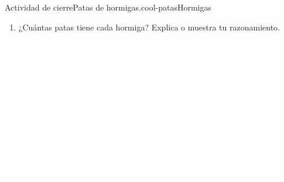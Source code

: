 \documentclass[14pt]{extarticle}
\begin{document}
\begin{project}{Actividad de cierre}{Patas de hormigas.}{cool-patasHormigas}
\begin{enumerate}[label={(\alph*)}]
\begin{image}{0}{1}{0}{}
\end{image}%
\item{}¿Cuántas patas tiene cada hormiga? Explica o muestra tu razonamiento.%
\begin{image}{0}{1}{0}{}%
\includegraphics[max width=\linewidth, center]{external/whitespace-tikz/4cm.pdf}
\end{image}%
\end{enumerate}
%
\end{project}
\end{document}
